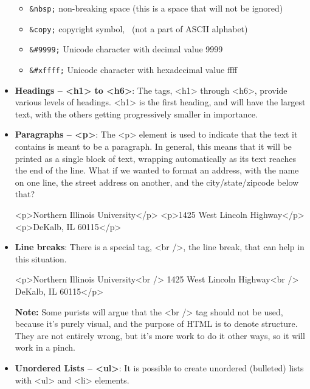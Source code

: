 \documentclass{report}
\begin{document}
\begin{itemize}
\begin{itemize}
            \item \texttt{\&nbsp;} non-breaking space (this is a space that will not be ignored)
            \item \texttt{\&copy;} copyright symbol, \textcopyright\ (not a part of ASCII alphabet)
            \item \texttt{\&\#9999;} Unicode character with decimal value 9999
            \item \texttt{\&\#xffff;} Unicode character with hexadecimal value ffff
        \end{itemize}
    \item \textbf{Headings – <h1> to <h6>}: The tags, <h1> through <h6>, provide various levels of headings. <h1> is the first heading, and will have the largest text, with the others getting progressively smaller in importance.
    \item \textbf{Paragraphs – <p>}: The <p> element is used to indicate that the text it contains is meant to be a paragraph. In general, this means that
        it will be printed as a single block of text, wrapping automatically as its text reaches the end of the line.
        \bigbreak \noindent 
        What if we wanted to format an address, with the name on one line, the street address on another, and the city/state/zipcode below that?
        \bigbreak \noindent 
        \begin{htmlcode}
            <p>Northern Illinois University</p>
            <p>1425 West Lincoln Highway</p>
            <p>DeKalb, IL 60115</p>
        \end{htmlcode}
    \item \textbf{Line breaks}: There is a special tag, <br />, the line break, that can help in this situation.
        \bigbreak \noindent 
        \begin{htmlcode}
            <p>Northern Illinois University<br />
                1425 West Lincoln Highway<br />
                DeKalb, IL 60115</p>
        \end{htmlcode}
        \bigbreak \noindent 
        \textbf{Note:} Some purists will argue that the <br /> tag should not be used, because it’s purely visual, and the purpose of HTML is to denote structure. They are not entirely wrong, but it’s more work to do it other ways, so it will work in a pinch.
    \item \textbf{Unordered Lists – <ul>}: It is possible to create unordered (bulleted) lists with <ul> and <li> elements.
        \bigbreak \noindent 
        \begin{htmlcode}

\end{htmlcode}
\end{itemize}
\end{document}
